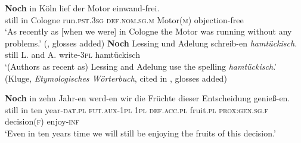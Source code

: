 \begin{exe}
	\ex\label{exAppendixGermanTimeScalar4}
	\gll \textbf{Noch} in Köln lief der Motor einwand-frei.\\
	still in Cologne run.\textsc{pst}.3\textsc{sg} \textsc{def}.\textsc{nom}.\textsc{sg}.\textsc{m} Motor(\textsc{m}) objection-free\\
	\glt \lq As recently as [when we were] in Cologne the Motor was running without any problems.\rq{ }(\cite[s.v. \textit{noch}]{Duden}, glosses added)
	\largerpage
	\ex\label{exAppendixGermanTimeScalar5}
	\gll \textbf{Noch} Lessing und Adelung schreib-en \textit{hamtückisch}.\\
	still L. and A. write-3\textsc{pl} hamtückisch\\
	\glt \lq (Authors as recent as) Lessing and Adelung use the spelling \textit{hamtückisch}.' (Kluge, \textit{Etymologisches Wörterbuch}, cited in \cite[52]{Shetter1966}, glosses added) 

	\ex\label{exAppendixGermanTimeScalar6}
	\gll \textbf{Noch} in zehn Jahr-en werd-en wir die Früchte dieser Entscheidung genieß-en.\\
	still in ten year-\textsc{dat}.\textsc{pl} \textsc{fut}.\textsc{aux}-1\textsc{pl} 1\textsc{pl} \textsc{def}.\textsc{acc}.\textsc{pl} fruit.\textsc{pl} \textsc{prox}:\textsc{gen}.\textsc{sg}.\textsc{f} decision(\textsc{f}) enjoy-\textsc{inf}\\
	\glt \lq Even in ten years time we will still be enjoying the fruits of this decision.' \parencite[182]{Koenig1979}
\end{exe}


